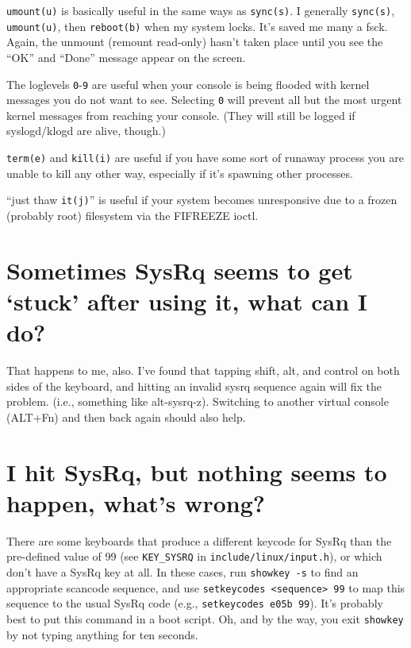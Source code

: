 \documentclass[article,letterpaper]{memoir}
\let\subsection\section
\let\section\chapter
\begin{document}
\texttt{umount(u)} is basically useful in the same ways as
\texttt{sync(s)}. I generally \texttt{sync(s)}, \texttt{umount(u)}, then
\texttt{reboot(b)} when my system locks. It's saved me many a fsck.
Again, the unmount (remount read-only) hasn't taken place until you see
the ``OK'' and ``Done'' message appear on the screen.

The loglevels \texttt{0}-\texttt{9} are useful when your console is
being flooded with kernel messages you do not want to see. Selecting
\texttt{0} will prevent all but the most urgent kernel messages from
reaching your console. (They will still be logged if syslogd/klogd are
alive, though.)

\texttt{term(e)} and \texttt{kill(i)} are useful if you have some sort
of runaway process you are unable to kill any other way, especially if
it's spawning other processes.

``just thaw \texttt{it(j)}'' is useful if your system becomes
unresponsive due to a frozen (probably root) filesystem via the FIFREEZE
ioctl.

\subsection{\texorpdfstring{Sometimes SysRq seems to get `stuck' after
using it, what can I
do?}{Sometimes SysRq seems to get stuck after using it, what can I do?}}\label{sometimes-sysrq-seems-to-get-stuck-after-using-it-what-can-i-do}

That happens to me, also. I've found that tapping shift, alt, and
control on both sides of the keyboard, and hitting an invalid sysrq
sequence again will fix the problem. (i.e., something like alt-sysrq-z).
Switching to another virtual console (ALT+Fn) and then back again should
also help.

\subsection{I hit SysRq, but nothing seems to happen, what's
wrong?}\label{i-hit-sysrq-but-nothing-seems-to-happen-whats-wrong}

There are some keyboards that produce a different keycode for SysRq than
the pre-defined value of 99 (see \texttt{KEY\_SYSRQ} in
\texttt{include/linux/input.h}), or which don't have a SysRq key at all.
In these cases, run \texttt{showkey\ -s} to find an appropriate scancode
sequence, and use
\texttt{setkeycodes\ \textless{}sequence\textgreater{}\ 99} to map this
sequence to the usual SysRq code (e.g., \texttt{setkeycodes\ e05b\ 99}).
It's probably best to put this command in a boot script. Oh, and by the
way, you exit \texttt{showkey} by not typing anything for ten seconds.
\end{document}
